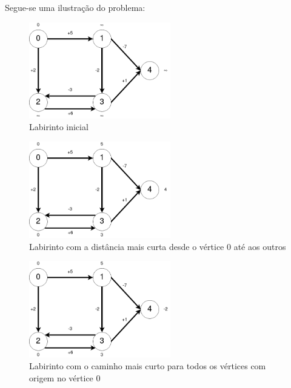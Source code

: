 \documentclass[11pt]{article}
\begin{document}
\newpage
Segue-se uma ilustração do problema:

\begin{figure}[h!]
    \includegraphics[width=0.55\textwidth, center]{imgs/grafo1.png}
    \caption{Labirinto inicial}
    \label{fig:grafo1}
\end{figure}

\begin{figure}[h!]
    \includegraphics[width=0.55\textwidth, center]{imgs/grafo2.png}
    \caption{Labirinto com a distância mais curta desde o vértice 0 até aos outros}
    \label{fig:grafo2}
\end{figure}

\begin{figure}[h!]
    \includegraphics[width=0.55\textwidth, center]{imgs/grafo3.png}
    \caption{Labirinto com o caminho mais curto para todos os vértices com origem no vértice 0}
    \label{fig:grafo3}
\end{figure}
\newpage
\end{document}
